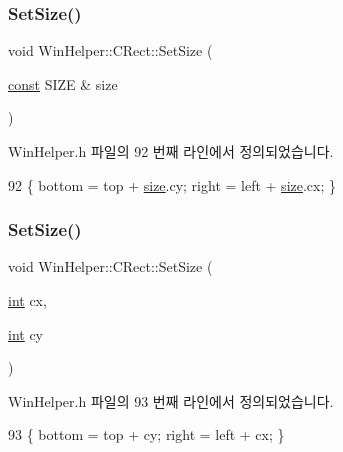 \subsubsection{\texorpdfstring{Set\+Size()}{SetSize()}\hspace{0.1cm}{\footnotesize\ttfamily [2/3]}}
{\footnotesize\ttfamily void Win\+Helper\+::\+C\+Rect\+::\+Set\+Size (\begin{DoxyParamCaption}\item[{\mbox{\hyperlink{getopt1_8c_a2c212835823e3c54a8ab6d95c652660e}{const}} S\+I\+ZE \&}]{size }\end{DoxyParamCaption})\hspace{0.3cm}{\ttfamily [inline]}}



Win\+Helper.\+h 파일의 92 번째 라인에서 정의되었습니다.


\begin{DoxyCode}
92 \{ bottom = top + \mbox{\hyperlink{expr-lex_8cpp_ab7d671599a7b25ca99a487fa341bc33a}{size}}.cy; right = left + \mbox{\hyperlink{expr-lex_8cpp_ab7d671599a7b25ca99a487fa341bc33a}{size}}.cx; \}
\end{DoxyCode}
\mbox{\label{class_win_helper_1_1_c_rect_a44277ee1ed92bf43b56021d630992987}} 
\subsubsection{\texorpdfstring{Set\+Size()}{SetSize()}\hspace{0.1cm}{\footnotesize\ttfamily [3/3]}}
{\footnotesize\ttfamily void Win\+Helper\+::\+C\+Rect\+::\+Set\+Size (\begin{DoxyParamCaption}\item[{\mbox{\hyperlink{_util_8cpp_a0ef32aa8672df19503a49fab2d0c8071}{int}}}]{cx,  }\item[{\mbox{\hyperlink{_util_8cpp_a0ef32aa8672df19503a49fab2d0c8071}{int}}}]{cy }\end{DoxyParamCaption})\hspace{0.3cm}{\ttfamily [inline]}}



Win\+Helper.\+h 파일의 93 번째 라인에서 정의되었습니다.


\begin{DoxyCode}
93 \{ bottom = top + cy; right = left + cx; \}
\end{DoxyCode}
\mbox{\label{class_win_helper_1_1_c_rect_a37d2e20ba4edaf4f3ab837862ba73c11}} 
